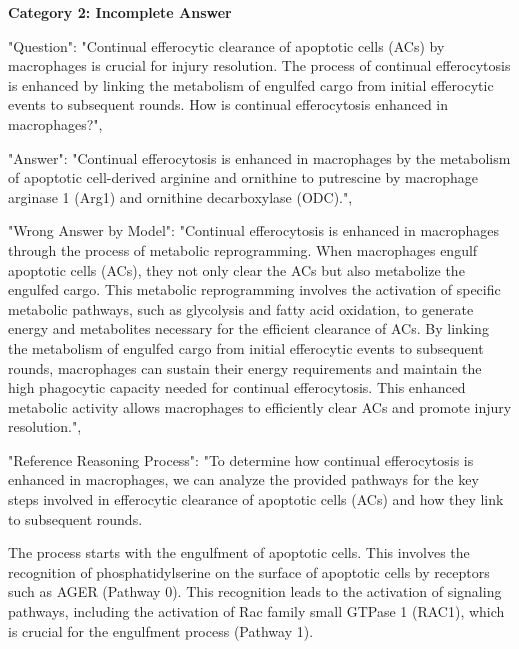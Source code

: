 \textbf{Category 2: Incomplete Answer}
\begin{tcolorbox}[breakable]
"Question": "Continual efferocytic clearance of apoptotic cells (ACs) by macrophages is crucial for injury resolution. The process of continual efferocytosis is enhanced by linking the metabolism of engulfed cargo from initial efferocytic events to subsequent rounds. How is continual efferocytosis enhanced in macrophages?",

"Answer": "Continual efferocytosis is enhanced in macrophages by the metabolism of apoptotic cell-derived arginine and ornithine to putrescine by macrophage arginase 1 (Arg1) and ornithine decarboxylase (ODC).",



"Wrong Answer by Model": "Continual efferocytosis is enhanced in macrophages through the process of metabolic reprogramming. When macrophages engulf apoptotic cells (ACs), they not only clear the ACs but also metabolize the engulfed cargo. This metabolic reprogramming involves the activation of specific metabolic pathways, such as glycolysis and fatty acid oxidation, to generate energy and metabolites necessary for the efficient clearance of ACs. By linking the metabolism of engulfed cargo from initial efferocytic events to subsequent rounds, macrophages can sustain their energy requirements and maintain the high phagocytic capacity needed for continual efferocytosis. This enhanced metabolic activity allows macrophages to efficiently clear ACs and promote injury resolution.",



"Reference Reasoning Process": "To determine how continual efferocytosis is enhanced in macrophages, we can analyze the provided pathways for the key steps involved in efferocytic clearance of apoptotic cells (ACs) and how they link to subsequent rounds.

The process starts with the engulfment of apoptotic cells. This involves the recognition of phosphatidylserine on the surface of apoptotic cells by receptors such as AGER (Pathway 0). This recognition leads to the activation of signaling pathways, including the activation of Rac family small GTPase 1 (RAC1), which is crucial for the engulfment process (Pathway 1).


\end{tcolorbox}
